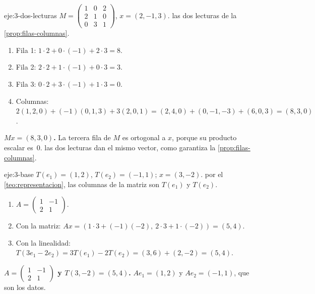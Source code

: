 \begin{solucion}{eje:3-dos-lecturas}
\datos $M=\begin{pmatrix}1&0&2\\2&1&0\\0&3&1\end{pmatrix}$, $x=(2,-1,3)$.
\planteamiento las dos lecturas de la \cref{prop:filas-columnas}.
\pasos
\begin{enumerate}[label=\arabic*.]
  \item Fila 1: $1\cdot 2+0\cdot(-1)+2\cdot 3=8$.
  \item Fila 2: $2\cdot 2+1\cdot(-1)+0\cdot 3=3$.
  \item Fila 3: $0\cdot 2+3\cdot(-1)+1\cdot 3=0$.
  \item Columnas: $2(1,2,0)+(-1)(0,1,3)+3(2,0,1)=(2,4,0)+(0,-1,-3)+(6,0,3)=(8,3,0)$.
\end{enumerate}
\resultado \textbf{$Mx=(8,3,0)$.} La tercera fila de $M$ es ortogonal a $x$, porque su producto escalar es~0.
\comprobacion las dos lecturas dan el mismo vector, como garantiza la \cref{prop:filas-columnas}.
\end{solucion}

\begin{solucion}{eje:3-base}
\datos $T(e_1)=(1,2)$, $T(e_2)=(-1,1)$; $x=(3,-2)$.
\planteamiento por el \cref{teo:representacion}, las columnas de la matriz son $T(e_1)$ y $T(e_2)$.
\pasos
\begin{enumerate}[label=\arabic*.]
  \item $A=\begin{pmatrix}1&-1\\2&1\end{pmatrix}$.
  \item Con la matriz: $Ax=(1\cdot 3+(-1)(-2),\ 2\cdot 3+1\cdot(-2))=(5,4)$.
  \item Con la linealidad: $T(3e_1-2e_2)=3T(e_1)-2T(e_2)=(3,6)+(2,-2)=(5,4)$.
\end{enumerate}
\resultado \textbf{$A=\begin{pmatrix}1&-1\\2&1\end{pmatrix}$ y $T(3,-2)=(5,4)$.}
\comprobacion $Ae_1=(1,2)$ y $Ae_2=(-1,1)$, que son los datos.
\end{solucion}

